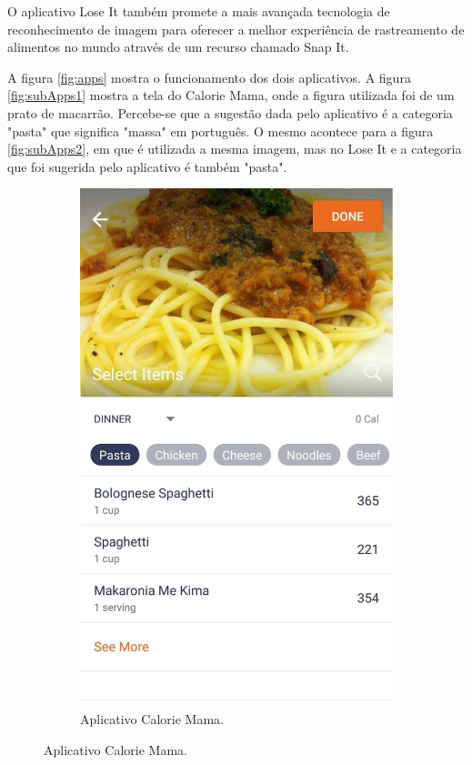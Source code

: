 O aplicativo Lose It \cite{lose_it} também promete a mais avançada tecnologia de reconhecimento de imagem para oferecer a melhor experiência de rastreamento de alimentos no mundo através de um recurso chamado Snap It.

A figura \ref{fig:apps} mostra o funcionamento dos dois aplicativos. A figura \ref{fig:subApps1} mostra a tela do Calorie Mama, onde a figura utilizada foi de um prato de macarrão. Percebe-se que a sugestão dada pelo aplicativo é a categoria "pasta" que significa "massa" em português. O mesmo acontece para a figura \ref{fig:subApps2}, em que é utilizada a mesma imagem, mas no Lose It e a categoria que foi sugerida pelo aplicativo é também "pasta".

\begin{figure}[!ht] 
\centering
\caption{Comparação entre os aplicativos.}
\label{fig:apps}
\begin{subfigure}{0.4\textwidth}
  \centering
    \caption{Aplicativo Calorie Mama.}
   \includegraphics[width=\textwidth]{imgs/mama.jpeg}

\end{subfigure}
\end{figure}
